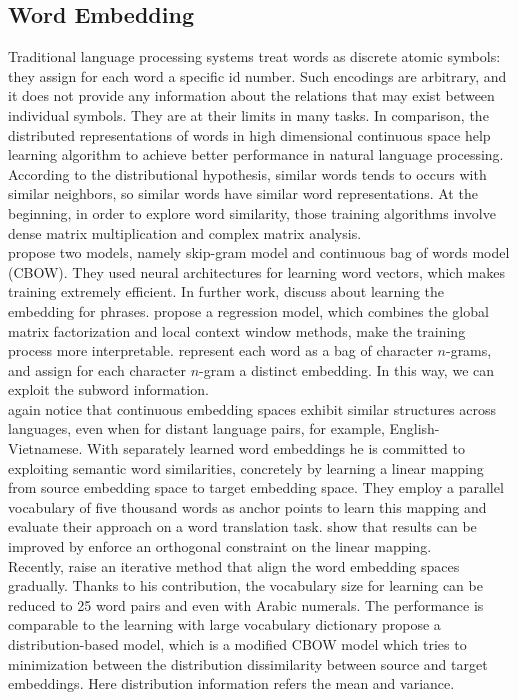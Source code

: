 \subsection{Word Embedding}
\indent Traditional language processing systems treat words as discrete atomic symbols: they assign for each word a specific id number. Such encodings are arbitrary, and it does not provide any information about the relations that may exist between individual symbols. They are at their limits in many tasks. In comparison, the distributed representations of words in high dimensional continuous space help learning algorithm to achieve better performance in natural language processing. According to the distributional hypothesis, similar words tends to occurs with similar neighbors, so similar words have similar word representations. At the beginning, in order to explore word similarity, those training algorithms involve dense matrix multiplication and complex matrix analysis. \\
\cite{mikolov2013efficient} propose two models, namely skip-gram model and continuous bag of words model (CBOW). They used neural architectures for learning word vectors, which makes training extremely efficient. In further work, \cite{mikolov2013distributed} discuss about learning the embedding for phrases. \cite{pennington2014glove} propose a regression model, which combines the global matrix factorization and local context window methods, make the training process more interpretable. \cite{bojanowski2016enriching} represent each word as a bag of character $n$-grams, and assign for each character $n$-gram a distinct embedding. In this way, we can exploit the subword information. \\
\cite{mikolov2013exploiting} again notice that continuous embedding spaces exhibit similar structures across languages, even when for distant language pairs, for example, English-Vietnamese.  With separately learned word embeddings he is committed to exploiting semantic word similarities, concretely by learning a linear mapping from source embedding space to target embedding space. They employ a parallel vocabulary of five thousand words as anchor points to learn this mapping and evaluate their approach on a word translation task. \cite{xing2015normalized} show that results can be improved by enforce an orthogonal constraint on the linear mapping. \\
Recently, \cite{artetxe2017learning} raise an iterative method that align the word embedding spaces gradually. Thanks to his contribution, the vocabulary size for learning can be reduced to 25 word pairs and even with Arabic numerals. The performance is comparable to the learning with large vocabulary dictionary \cite{cao2016distribution} propose a distribution-based model, which is a modified CBOW model which tries to minimization between the distribution dissimilarity between source and target embeddings. Here distribution information refers the mean and variance. 
